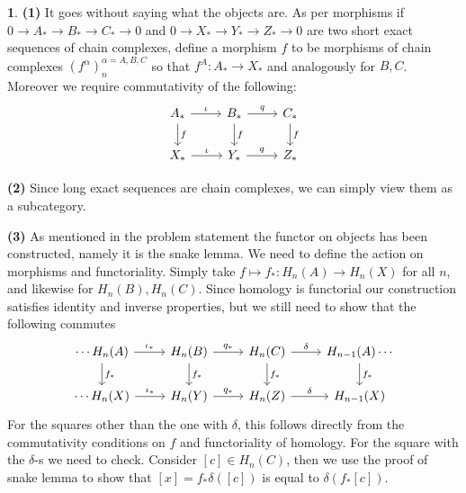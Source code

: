 \documentclass[10.5pt]{article}
\theoremstyle{definition}
\newtheorem{pb}{}
\begin{document}
    \begin{pb}
        \textbf{(1)} It goes without saying what the objects are. As per morphisms if \(0 \to A_* \to B_* \to C_* \to 0\) and \(0 \to X_* \to Y_* \to Z_* \to 0\) are two short exact sequences of chain complexes, define a morphism \(f\) to be morphisms of chain complexes \((f^{\alpha})^{\alpha = A,B,C}_n\) so that \(f^A: A_* \to X_*\) and analogously for \(B,C\). Moreover we require commutativity of the following:
        \begin{equation*}
            \begin{tikzcd}
            A_* \arrow[d,"f"] \arrow[r,"\iota"] &B_* \arrow[d,"f"] \arrow[r,"q"] &C_* \arrow[d,"f"] \\
            X_* \arrow[r,"\iota"] &Y_* \arrow[r,"q"] &Z_*
            \end{tikzcd}
        \end{equation*}

        \textbf{(2)} Since long exact sequences are chain complexes, we can simply view them as a subcategory.

        \textbf{(3)} As mentioned in the problem statement the functor on objects has been constructed, namely it is the snake lemma. We need to define the action on morphisms and functoriality. Simply take \(f \mapsto f_*: H_n(A) \to H_n(X)\) for all \(n\), and likewise for \(H_n(B),H_n(C)\). Since homology is functorial our construction satisfies identity and inverse properties, but we still need to show that the following commutes
        \begin{equation*}
            \begin{tikzcd}
            \cdots H_n(A) \arrow[d,"f_*"] \arrow[r, "\iota_*"] &H_n(B) \arrow[d,"f_*"] \arrow[r,"q_*"] &H_n(C) \arrow[d,"f_*"] \arrow[r,"\delta"] & H_{n-1}(A) \arrow[d,"f_*"] \cdots \\
            \cdots H_n(X) \arrow[r,"\iota_*"] &H_n(Y) \arrow[r,"q_*"] &H_n(Z) \arrow[r,"\delta"] &H_{n-1}(X)
            \end{tikzcd}
        \end{equation*}
        For the squares other than the one with \(\delta\), this follows directly from the commutativity conditions on \(f\) and functoriality of homology. For the square with the \(\delta\)-s we need to check. Consider \([c] \in H_n(C)\), then we use the proof of snake lemma to show that \([x] = f_*\delta([c])\) is equal to \(\delta(f_*[c])\).


\end{pb}
\end{document}

